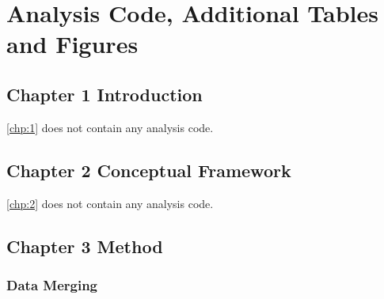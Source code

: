 \chapter{Analysis Code, Additional Tables and Figures}

\section{Chapter 1 Introduction}

\cref{chp:1} does not contain any analysis code.

\section{Chapter 2 Conceptual Framework}

\cref{chp:2} does not contain any analysis code.

\section{Chapter 3 Method}

%

%

%

\subsection{Data Merging} \label{R.reimport}
\begin{singlespacing}
    
\end{singlespacing}





